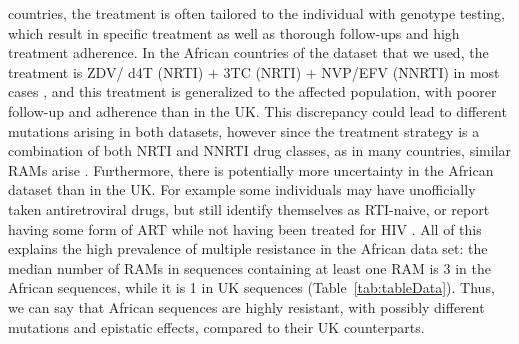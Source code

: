 \documentclass[
  11,
]{scrbook}
\begin{document}
countries, the treatment is often tailored to the individual with
genotype testing, which result in specific treatment as well as thorough
follow-ups and high treatment adherence. In the African countries of the
dataset that we used, the treatment is ZDV/ d4T (NRTI) + 3TC (NRTI) +
NVP/EFV (NNRTI) in most cases
\autocite{villabona-arenasIndepthAnalysisHIV12016}, and this treatment is
generalized to the affected population, with poorer follow-up and
adherence than in the UK. This discrepancy could lead to different
mutations arising in both datasets, however since the treatment strategy
is a combination of both NRTI and NNRTI drug classes, as in many
countries, similar RAMs arise
\autocite{villabona-arenasIndepthAnalysisHIV12016}. Furthermore, there is
potentially more uncertainty in the African dataset than in the UK. For
example some individuals may have unofficially taken antiretroviral
drugs, but still identify themselves as RTI-naive, or report having some
form of ART while not having been treated for HIV
\autocite{mooneySocialDesirabilityBias2018}. All of this explains the high
prevalence of multiple resistance in the African data set: the median
number of RAMs in sequences containing at least one RAM is 3 in the
African sequences, while it is 1 in UK sequences
(Table~\ref{tab:tableData}).
Thus, we can say that African sequences are highly resistant, with
possibly different mutations and epistatic effects, compared to their UK
counterparts.\\
\end{document}
